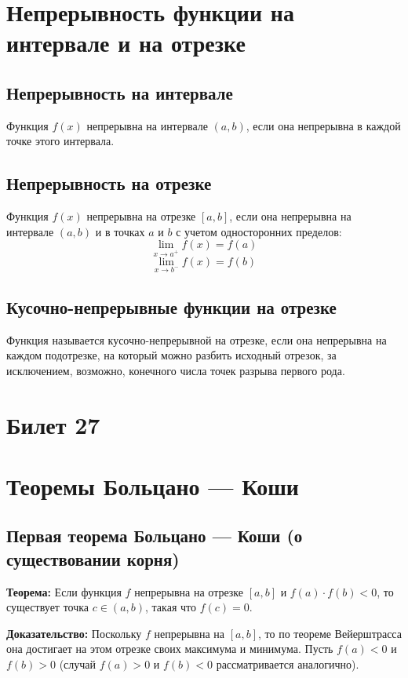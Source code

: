 \documentclass{article}
\begin{document}
\section*{Непрерывность функции на интервале и на отрезке}

\subsection*{Непрерывность на интервале}
Функция \( f(x) \) непрерывна на интервале \( (a, b) \), если она непрерывна в каждой точке этого интервала.

\subsection*{Непрерывность на отрезке}
Функция \( f(x) \) непрерывна на отрезке \( [a, b] \), если она непрерывна на интервале \( (a, b) \) и в точках \( a \) и \( b \) с учетом односторонних пределов:
\[
\lim_{x \to a^+} f(x) = f(a)
\]
\[
\lim_{x \to b^-} f(x) = f(b)
\]

\subsection*{Кусочно-непрерывные функции на отрезке}
Функция называется кусочно-непрерывной на отрезке, если она непрерывна на каждом подотрезке, на который можно разбить исходный отрезок, за исключением, возможно, конечного числа точек разрыва первого рода.

\section{Билет 27}

\section*{Теоремы Больцано — Коши}

\subsection*{Первая теорема Больцано — Коши (о существовании корня)}

\textbf{Теорема:} Если функция \( f \) непрерывна на отрезке \([a, b]\) и \( f(a) \cdot f(b) < 0 \), то существует точка \( c \in (a, b) \), такая что \( f(c) = 0 \).

\textbf{Доказательство:} Поскольку \( f \) непрерывна на \([a, b]\), то по теореме Вейерштрасса она достигает на этом отрезке своих максимума и минимума. Пусть \( f(a) < 0 \) и \( f(b) > 0 \) (случай \( f(a) > 0 \) и \( f(b) < 0 \) рассматривается аналогично).
\end{document}

